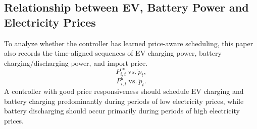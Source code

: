 \subsection{Relationship between EV, Battery Power and Electricity Prices}

To analyze whether the controller has learned price-aware scheduling, this paper also records the time-aligned sequences of EV charging power, battery charging/discharging power, and import price. 
\[
  P^{ev}_{i,t}\ \mathrm{vs.}\ \tilde p_t,
\]
\[
  P^b_{i,t}\ \mathrm{vs.}\ \tilde p_t.
\]
A controller with good price responsiveness should schedule EV charging and battery charging predominantly during periods of low electricity prices, while battery discharging should occur primarily during periods of high electricity prices. 
